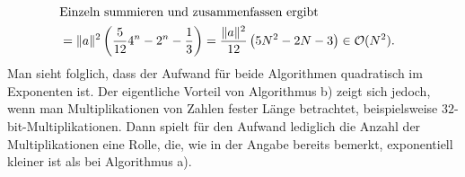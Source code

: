 \begin{flushenum}
\begin{align*}
	  \intertext{\noindent Einzeln summieren und zusammenfassen ergibt}
	  & = \|a\|^2 \left(\frac{5}{12}4^n -2^n -\frac{1}{3}\right)
	  = \frac{\|a\|^2}{12} \left(5N^2 - 2N - 3\right) \in
	  \mathcal{O}(N^2).
  \end{align*}
  Man sieht folglich, dass der Aufwand für beide Algorithmen quadratisch im
  Exponenten ist. Der eigentliche Vorteil von Algorithmus b) zeigt sich jedoch,
  wenn man Multiplikationen von Zahlen fester Länge betrachtet, beispielsweise
  $32$-bit-Multiplikationen. Dann spielt für den Aufwand lediglich die Anzahl
  der Multiplikationen eine Rolle, die, wie in der Angabe bereits bemerkt,
  exponentiell kleiner ist als bei Algorithmus a).
\end{flushenum}
